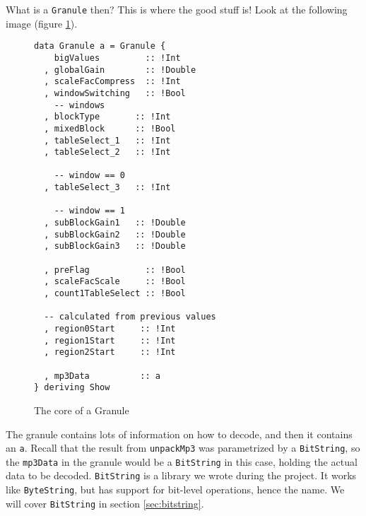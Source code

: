 \documentclass[a4paper,12pt]{article}
\begin{document}
    What is a \texttt{Granule} then? This is where the good stuff is! Look at
    the following image (figure \ref{fig:granule_type}).
\begin{figure}[H]
  \begin{center}
    \begin{lstlisting}
data Granule a = Granule {
    bigValues         :: !Int
  , globalGain        :: !Double
  , scaleFacCompress  :: !Int
  , windowSwitching   :: !Bool
    -- windows
  , blockType       :: !Int
  , mixedBlock      :: !Bool
  , tableSelect_1   :: !Int
  , tableSelect_2   :: !Int

    -- window == 0
  , tableSelect_3   :: !Int

    -- window == 1
  , subBlockGain1   :: !Double
  , subBlockGain2   :: !Double
  , subBlockGain3   :: !Double

  , preFlag           :: !Bool
  , scaleFacScale     :: !Bool
  , count1TableSelect :: !Bool

  -- calculated from previous values
  , region0Start     :: !Int
  , region1Start     :: !Int
  , region2Start     :: !Int

  , mp3Data          :: a
} deriving Show
    \end{lstlisting}
    \caption{The core of a Granule}\label{fig:granule_type}
  \end{center}
\end{figure}

    The granule contains lots of information on how to decode, and then it
    contains an \texttt{a}. Recall that the result from \texttt{unpackMp3} was
    parametrized by a \texttt{BitString}, so the \texttt{mp3Data} in the granule
    would be a \texttt{BitString} in this case, holding the actual data to be
    decoded. \texttt{BitString} is a library we wrote during the project. It
    works like \texttt{ByteString}, but has support for bit-level operations,
    hence the name. We will cover \texttt{BitString} in section
    \ref{sec:bitstring}.
\end{document}
